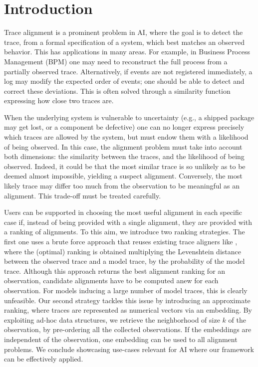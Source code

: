 
\section{Introduction}
\label{introduction}

Trace alignment is a prominent problem in AI, where the goal is to detect the trace, from a formal specification of a system,
which best matches an observed behavior. This has applications in many areas. For example, in Business Process Management (BPM)
one may need to reconstruct the full process from a partially observed trace. Alternatively, if events are not registered immediately,
a log may modify the expected order of events; one should be able to detect and correct these deviations. This is often solved
through a similarity function expressing how close two traces are.

When the underlying system is vulnerable to uncertainty (e.g., a shipped package may get lost, or a component be defective)
one can no longer express precisely which traces are allowed by the system, but must endow them with a likelihood
of being observed. In this case, the alignment problem must take into account both dimensions: the similarity between the
traces, and the likelihood of being observed. Indeed, it could be that the most similar trace is so unlikely as to be deemed almost
impossible, yielding a suspect alignment. Conversely, the most likely trace may differ too much from the observation to be
meaningful as an alignment. This trade-off must be treated carefully. 

Users can be supported in choosing the most useful alignment in each specific case if, instead of being provided with a single alignment, they are provided with a ranking of alignments. To this aim, we introduce two ranking strategies. The first one uses a brute force approach that reuses existing trace aligners like \cite{DBLP:conf/edoc/AdriansyahDA11,LeoniM17}, where the (optimal) ranking
is obtained multiplying the Levenshtein distance between the observed trace and a model trace, by the probability of the
model trace. Although this approach returns the best alignment ranking for an observation, candidate alignments have to be computed
anew for each observation. For models inducing a large number of model traces, this is clearly unfeasible. Our second
strategy tackles this issue by introducing an approximate ranking, where traces are represented as numerical vectors via an embedding.
By exploiting ad-hoc data structures, we retrieve the neighborhood of size $k$ of the observation, by pre-ordering all the collected observations. If the embeddings are independent of the observation, one embedding can be used to all alignment problems.
We conclude showcasing use-cases relevant for AI where our framework can be effectively applied. 